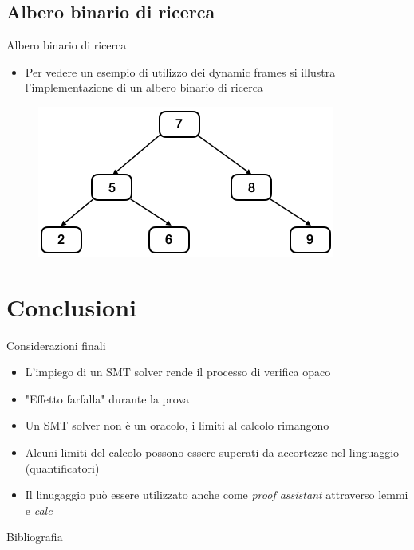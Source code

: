 \documentclass[]{beamer}
\newcommand\Fontvi{\fontsize{10}{7.2}\selectfont}
\begin{document}
\subsection{Albero binario di ricerca}
\begin{frame}{Albero binario di ricerca}
    \begin{itemize}
        \item Per vedere un esempio di utilizzo dei dynamic frames si illustra l'implementazione di un albero binario di ricerca
    \end{itemize}
    \begin{figure}
        \centering
        \includegraphics[scale=0.5]{assets/img/bst.png}
    \end{figure}
\end{frame}

\section{Conclusioni}
\begin{frame}{Considerazioni finali}
\begin{itemize}
    \item L'impiego di un SMT solver rende il processo di verifica opaco
    \item "Effetto farfalla" durante la prova
    \item Un SMT solver non è un oracolo, i limiti al calcolo rimangono
    \item Alcuni limiti del calcolo possono essere superati da accortezze nel linguaggio (quantificatori)
    \item Il linugaggio può essere utilizzato anche come \textit{proof assistant} attraverso lemmi e \textit{calc}
\end{itemize}
\end{frame}

\begin{frame}{Bibliografia}
    \Fontvi
    
    
\end{frame}
\end{document}
